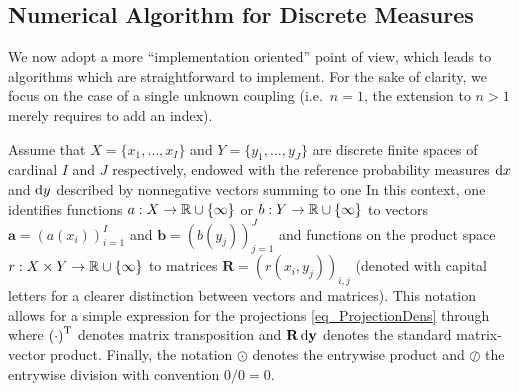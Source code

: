 \subsection{Numerical Algorithm for Discrete Measures}
We now adopt a more ``implementation oriented'' point of view, which leads to algorithms which are straightforward to implement. For the sake of clarity, we focus on the case of a single unknown coupling (i.e.\ $n=1$, the extension to $n>1$ merely requires to add an index).

Assume that $X = \{x_1,\ldots,x_I\}$ and $Y=\{y_1,\ldots,y_J\}$ are discrete finite spaces of cardinal $I$ and $J$ respectively, endowed with the reference probability measures $\mathrm{d} x$ and $\mathrm{d} y$ described by nonnegative vectors summing to one
%
In this context, one identifies functions $a : X\to \mathbb{R}\cup \{\infty\}$ or $b:Y\to \mathbb{R} \cup \{\infty\}$ to vectors $\mathbf{a} =(a(x_i))_{i=1}^I$ and $\mathbf{b} =(b(y_j))_{j=1}^J$ and functions on the product space $r : X\times Y \to \mathbb{R}\cup \{\infty\}$ to matrices $\mathbf{R} = (r(x_i,y_j))_{i,j}$ (denoted with capital letters for a clearer distinction between vectors and matrices). 
%
This notation allows for a simple expression for the projections \eqref{eq_ProjectionDens} through
where ${(\cdot)}^{\mathrm{T}}$ denotes matrix transposition and $\mathbf{R}\,\mathbf{\mathrm{d} y}$ denotes the standard matrix-vector product. Finally, the notation $\odot$ denotes the entrywise product and $\oslash$ the entrywise division with convention $0/0=0$.

